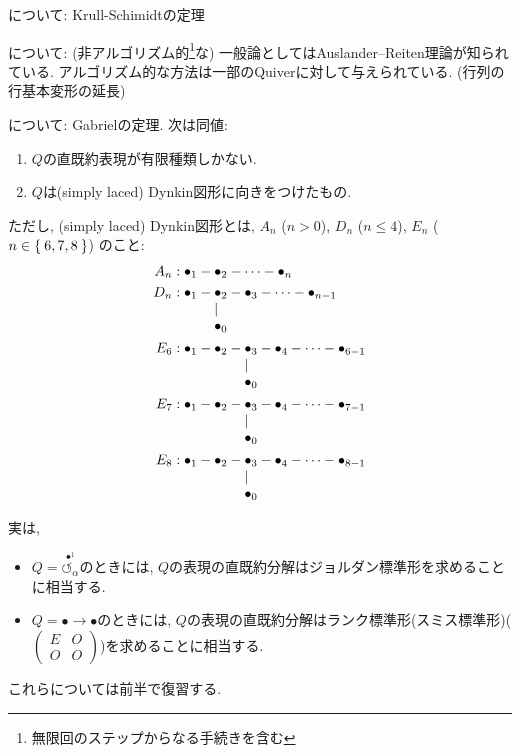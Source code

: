 について:
Krull-Schimidtの定理%

について:
(非アルゴリズム的\footnote{無限回のステップからなる手続きを含む}な)
一般論としてはAuslander--Reiten理論が知られている.
アルゴリズム的な方法は一部のQuiverに対して与えられている.
(行列の行基本変形の延長)

について:
Gabrielの定理.
次は同値:
\begin{enumerate}
\item
  $Q$の直既約表現が有限種類しかない.
\item
  $Q$は(simply laced) Dynkin図形に向きをつけたもの.
\end{enumerate}
ただし, (simply laced) Dynkin図形とは,
$A_n$ ($n>0$), $D_n$ ($n\leq 4$), $E_n$ ($n\in\Set{6,7,8}$)
のこと:
  \begin{align*}
    A_n &: \bullet_1 -\bullet_2-\cdots -\bullet_n\\
    D_n &: \bullet_1 -\!\!\!\begin{array}[t]{l}\bullet_2\\|\\\bullet_0\end{array}\!\!\!-\bullet_3-\cdots -\bullet_{n-1}\\
    E_6 &: \bullet_1-\bullet_2 -\!\!\!\begin{array}[t]{l}\bullet_3\\|\\\bullet_0\end{array}\!\!\!-\bullet_4-\cdots -\bullet_{6-1}\\
    E_7 &: \bullet_1-\bullet_2 -\!\!\!\begin{array}[t]{l}\bullet_3\\|\\\bullet_0\end{array}\!\!\!-\bullet_4-\cdots -\bullet_{7-1}\\
    E_8 &: \bullet_1-\bullet_2 -\!\!\!\begin{array}[t]{l}\bullet_3\\|\\\bullet_0\end{array}\!\!\!-\bullet_4-\cdots -\bullet_{8-1}\\
  \end{align*}


実は, 
\begin{itemize}
\item
  $Q=\stackrel{\bullet^{1}}{\circlearrowleft_{\alpha}}$のときには,
  $Q$の表現の直既約分解はジョルダン標準形を求めることに相当する.
\item
  $Q=\bullet\to\bullet$のときには,
  $Q$の表現の直既約分解はランク標準形(スミス標準形)($\begin{pmatrix}E&O\\O&O\end{pmatrix}$)を求めることに相当する.
\end{itemize}
これらについては前半で復習する.


